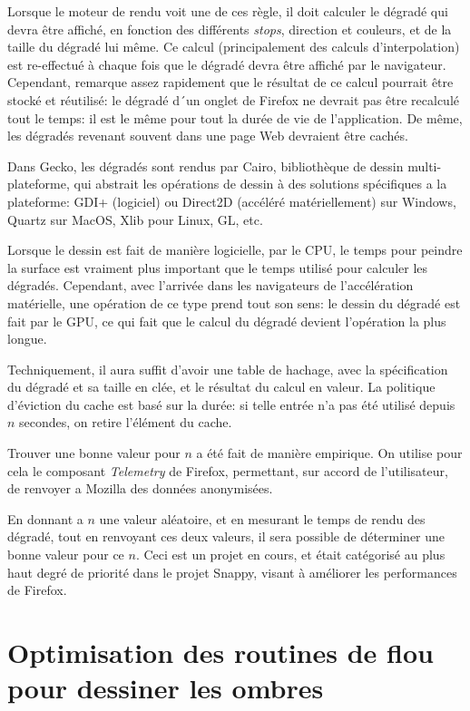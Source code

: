 \documentclass[a4paper,10pt]{article}
\begin{document}
\begin{multicols}{2}
  Lorsque le moteur de rendu voit une de ces règle, il doit calculer le dégradé
  qui devra être affiché, en fonction des différents \emph{stops}, direction et
  couleurs, et de la taille du dégradé lui même. Ce calcul (principalement des
  calculs d'interpolation) est re-effectué à chaque fois que le dégradé devra
  être affiché par le navigateur. Cependant, remarque assez rapidement que le
  résultat de ce calcul pourrait être stocké et réutilisé: le dégradé d´un
  onglet de Firefox ne devrait pas être recalculé tout le temps: il est le même
  pour tout la durée de vie de l'application. De même, les dégradés revenant
  souvent dans une page Web devraient être cachés.

  Dans Gecko, les dégradés sont rendus par Cairo, bibliothèque de dessin
  multi-plateforme, qui abstrait les opérations de dessin à des solutions
  spécifiques a la plateforme: GDI+ (logiciel) ou Direct2D (accéléré
  matériellement) sur Windows, Quartz sur MacOS, Xlib pour Linux, GL, etc.

  Lorsque le dessin est fait de manière logicielle, par le CPU, le temps pour
  peindre la surface est vraiment plus important que le temps utilisé pour
  calculer les dégradés. Cependant, avec l'arrivée dans les navigateurs de
  l'accélération matérielle, une opération de ce type prend tout son sens: le
  dessin du dégradé est fait par le GPU, ce qui fait que le calcul du dégradé
  devient l'opération la plus longue.

  Techniquement, il aura suffit d'avoir une table de hachage, avec la
  spécification du dégradé et sa taille en clée, et le résultat du calcul en
  valeur. La politique d'éviction du cache est basé sur la durée: si telle
  entrée n'a pas été utilisé depuis $n$ secondes, on retire l'élément du cache.

  Trouver une bonne valeur pour $n$ a été fait de manière empirique. On utilise
  pour cela le composant \emph{Telemetry} de Firefox, permettant, sur accord de
  l'utilisateur, de renvoyer a Mozilla des données anonymisées.

  En donnant a $n$ une valeur aléatoire, et en mesurant le temps de rendu des
  dégradé, tout en renvoyant ces deux valeurs, il sera possible de déterminer
  une bonne valeur pour ce $n$. Ceci est un projet en cours, et était catégorisé
  au plus haut degré de priorité dans le projet Snappy, visant à améliorer les
  performances de Firefox.

  \section{Optimisation des routines de flou pour dessiner les ombres}


\end{multicols}
\end{document}

